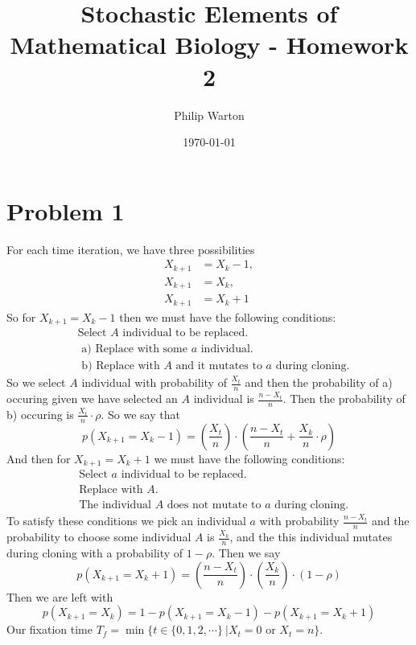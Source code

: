 \documentclass{article}
\theoremstyle{definition}
\begin{document}
\title{Stochastic Elements of Mathematical Biology - Homework 2}
\author{Philip Warton}
\date{\today}
\maketitle
\section*{Problem 1}
For each time iteration, we have three possibilities 
\begin{align*}X_{k+1} &= X_k - 1,\\ X_{k+1} &= X_k,\\ X_{k+1} &= X_k + 1\end{align*}
So for $X_{k+1} = X_k - 1$ then we must have the following conditions:
\begin{align*}
    &\text{Select $A$ individual to be replaced.}\\
    &\text{    a) Replace with some $a$ individual.}\\
    &\text{    b) Replace with $A$ and it mutates to $a$ during cloning.}
\end{align*}
So we select $A$ individual with probability of $\frac{X_t}{n}$ and then the probability 
of a) occuring given we have selected an $A$ individual is $\frac{n - X_t}{n}$. Then 
the probability of b) occuring is $\frac{X_t}{n} \cdot \rho$. So we say that 
\[
    p(X_{k+1} = X_k - 1) = \left(\frac{X_t}{n}\right) \cdot \left(\frac{n-X_t}{n} + \frac{X_k}{n} \cdot \rho\right)
\]
And then for $X_{k + 1} = X_k + 1$ we must have the following conditions:
\begin{align*}
    &\text{Select $a$ individual to be replaced.}\\
    &\text{Replace with $A$.}\\
    &\text{The individual $A$ does not mutate to $a$ during cloning.}
\end{align*}
To satisfy these conditions we pick an individual $a$ with probability $\frac{n-X_t}{n}$ and 
the probability to choose some individual $A$ is $\frac{X_k}{n}$, and the this individual
mutates during cloning with a probability of $1-\rho$. Then we say 
\[
    p(X_{k+1} = X_k + 1) = \left(\frac{n-X_t}{n}\right)\cdot \left(\frac{X_k}{n}\right)\cdot (1- \rho)
\]
Then we are left with
\[
p(X_{k+1} = X_k) = 1 - p(X_{k+1} = X_k - 1) - p(X_{k+1} = X_k + 1)
\]
Our fixation time $T_f = \min\{t \in \{0,1,2,\cdots\} \ | X_t = 0 \text{ or } X_t = n\}$.
\end{document}
